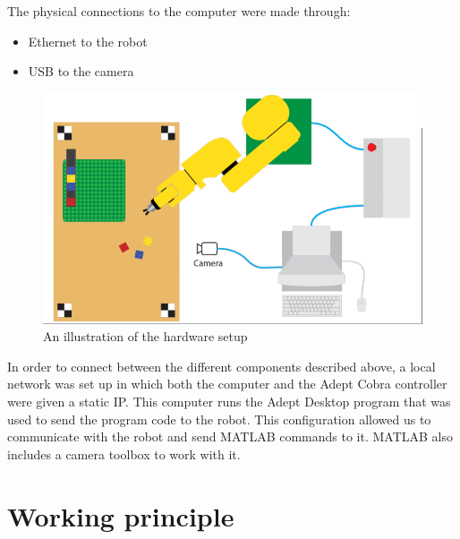 The physical connections to the computer were made through: 
\begin{itemize}
	\item Ethernet to the robot  
	\item USB to the camera 
\end{itemize}

\begin{figure}[H]
	\centering
	\includegraphics[scale=0.4]{figures/robotCellDesign.png}
	\caption{An illustration of the hardware setup}
\end{figure}

In order to connect between the different components described above, a local network was set up in which both the computer and the Adept Cobra controller were given a static IP. This computer runs the Adept Desktop program that was used to send the program code to the robot. This configuration allowed us to communicate with the robot and send MATLAB commands to it. MATLAB also includes a camera toolbox to work with it. 

\section{Working principle}

